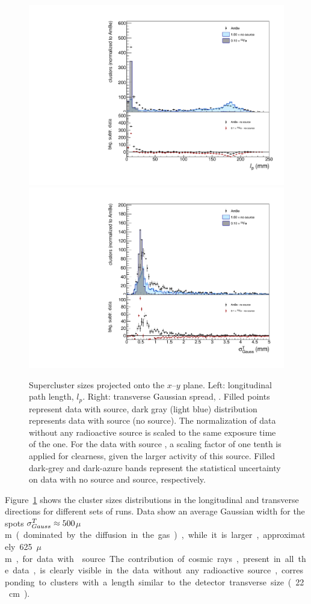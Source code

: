 \begin{figure}[ht]
  \begin{center}
  \includegraphics[width=0.45\linewidth]{figures/length}
  \includegraphics[width=0.45\linewidth]{figures/tgausssigma}

  \caption{Supercluster sizes projected onto the $x$--$y$ plane. Left:
    longitudinal path length, $l_p$.  Right: transverse Gaussian
    spread, \tsigmag. Filled points represent data with \ambe source,
    dark gray (light blue) distribution represents data with \fe
    source (no source).  The normalization of data without any
    radioactive source is scaled to the same exposure time of
    the \ambe one. For the data with \fe source , a scaling factor of
    one tenth is applied for clearness, given the larger activity of
    this source. Filled dark-grey and dark-azure bands represent the
    statistical uncertainty on data with no source and \fe source,
    respectively. \label{fig:clsize}}

    \end{center}
\end{figure}

Figure~\ref{fig:clsize} shows the cluster sizes distributions in the
longitudinal and transverse directions for different sets of
runs. Data show an average Gaussian width for the \fe spots
$\sigma^T_{Gauss}\approx500$\unit{$\mu$m} (dominated by the diffusion in the
gas), while it is larger, approximately 625\unit{$\mu$m}, for data
with \ambe source.  The contribution of cosmic rays, present in all
the data, is clearly visible in the data without any radioactive
source, corresponding to clusters with a length similar to the
detector transverse size (22\unit{cm}).

